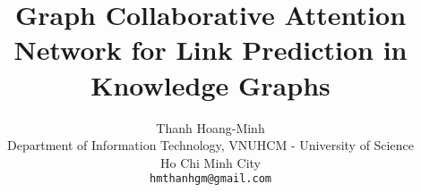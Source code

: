 \documentclass[10pt,twocolumn,letterpaper]{article}
\title{Graph Collaborative Attention Network for Link Prediction in Knowledge Graphs}
\author{Thanh Hoang-Minh\\
Department of Information Technology, VNUHCM - University of Science\\
Ho Chi Minh City \\
{\tt\small hmthanhgm@gmail.com}
}
\begin{document}
\maketitle
    







{
    \small
    
    
}


% 
\end{document}
